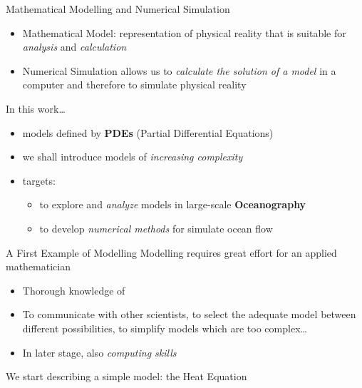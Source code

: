 \begin{frame}{Mathematical Modelling and Numerical Simulation}
  \begin{itemize}
  \item \alert{Mathematical Model}: representation of physical reality
    that is suitable for \textit{analysis} and \textit{calculation}
  \item \alert{Numerical Simulation} allows us to \textit{calculate the
    solution of a model} in a computer and therefore to simulate
    physical reality
  \end{itemize}
  \medskip
  In this work\dots
  \smallskip
  \begin{itemize}
  \item models defined by \textbf{PDEs} (Partial Differential Equations)
  \item we shall introduce models of \textit{increasing complexity}
  \item targets:
    \begin{itemize}
    \item to explore and \textit{analyze} models in large-scale
      \textbf{Oceanography}
    \item to develop \textit{numerical methods} for simulate
      ocean flow
    \end{itemize}
  \end{itemize}
\end{frame}

\begin{frame}{A First Example of Modelling}
  Modelling requires \alert{great effort} for an applied mathematician
  \begin{itemize}
  \item Thorough knowledge of 
  \item To communicate with other scientists, to select the adequate
    model between different possibilities, to simplify models which
    are too complex\dots
  \item In later stage, also \textit{computing skills}
  \end{itemize}

  \bigskip
  We start describing a simple model: the \alert{Heat Equation}
\end{frame}

